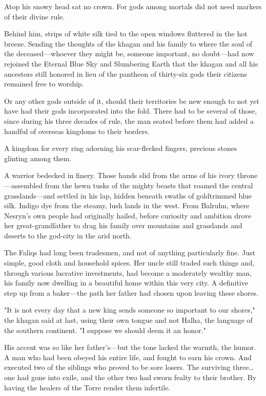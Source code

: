 Atop his snowy head sat no crown. For gods among mortals did not need markers of their divine rule.

Behind him, strips of white silk tied to the open windows fluttered in the hot breeze. Sending the thoughts of the khagan and his family to where the soul of the deceased---whoever they might be, someone important, no doubt---had now rejoined the Eternal Blue Sky and Slumbering Earth that the khagan and all his ancestors still honored in lieu of the pantheon of thirty-six gods their citizens remained free to worship.

Or any other gods outside of it, should their territories be new enough to not yet have had their gods incorporated into the fold. There had to be several of those, since during his three decades of rule, the man seated before them had added a handful of overseas kingdoms to their borders.

A kingdom for every ring adorning his scar-flecked fingers, precious stones glinting among them.

A warrior bedecked in finery. Those hands slid from the arms of his ivory throne---assembled from the hewn tusks of the mighty beasts that roamed the central grasslands---and settled in his lap, hidden beneath swaths of goldtrimmed blue silk. Indigo dye from the steamy, lush lands in the west. From Balruhn, where Nesryn's own people had originally hailed, before curiosity and ambition drove her great-grandfather to drag his family over mountains and grasslands and deserts to the god-city in the arid north.

The Faliqs had long been tradesmen, and not of anything particularly fine. Just simple, good cloth and household spices. Her uncle still traded such things and, through various lucrative investments, had become a moderately wealthy man, his family now dwelling in a beautiful home within this very city. A definitive step up from a baker---the path her father had chosen upon leaving these shores.

"It is not every day that a new king sends someone so important to our shores," the khagan said at last, using their own tongue and not Halha, the language of the southern continent. "I suppose we should deem it an honor."

His accent was so like her father's---but the tone lacked the warmth, the humor. A man who had been obeyed his entire life, and fought to earn his crown. And executed two of the siblings who proved to be sore losers. The surviving three\ldots one had gone into exile, and the other two had sworn fealty to their brother. By having the healers of the Torre render them infertile.

